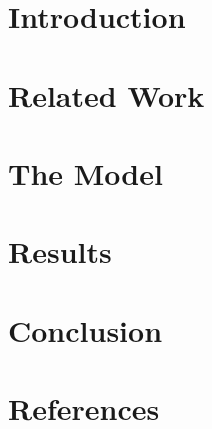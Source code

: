 \section{Introduction}


\section{Related Work}


\section{The Model}


\section{Results}


\section{Conclusion}


\section*{References}

